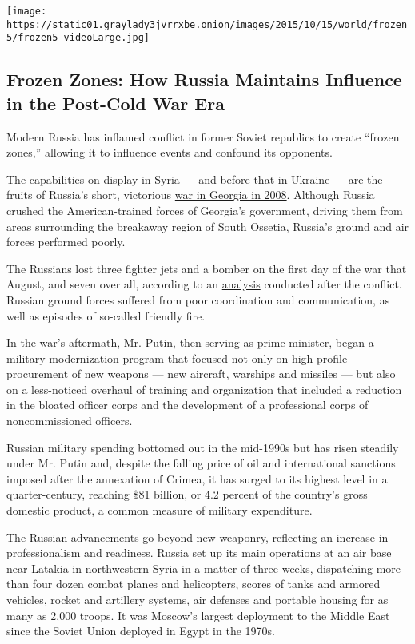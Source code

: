 \texttt{[image: https://static01.graylady3jvrrxbe.onion/images/2015/10/15/world/frozen5/frozen5-videoLarge.jpg]}

\hypertarget{frozen-zones-how-russia-maintains-influence-in-the-post-cold-war-era}{%
\subsection{Frozen Zones: How Russia Maintains Influence in the
Post-Cold War
Era}\label{frozen-zones-how-russia-maintains-influence-in-the-post-cold-war-era}}

Modern Russia has inflamed conflict in former Soviet republics to create
``frozen zones,'' allowing it to influence events and confound its
opponents.

The capabilities on display in Syria --- and before that in Ukraine ---
are the fruits of Russia's short, victorious
\href{http://www.nytimes3xbfgragh.onion/2008/08/09/world/europe/09georgia.html?pagewanted=all}{war
in Georgia in 2008}. Although Russia crushed the American-trained forces
of Georgia's government, driving them from areas surrounding the
breakaway region of South Ossetia, Russia's ground and air forces
performed poorly.

The Russians lost three fighter jets and a bomber on the first day of
the war that August, and seven over all, according to an
\href{http://www.cast.ru/eng/?id=328}{analysis} conducted after the
conflict. Russian ground forces suffered from poor coordination and
communication, as well as episodes of so-called friendly fire.

In the war's aftermath, Mr. Putin, then serving as prime minister, began
a military modernization program that focused not only on high-profile
procurement of new weapons --- new aircraft, warships and missiles ---
but also on a less-noticed overhaul of training and organization that
included a reduction in the bloated officer corps and the development of
a professional corps of noncommissioned officers.

Russian military spending bottomed out in the mid-1990s but has risen
steadily under Mr. Putin and, despite the falling price of oil and
international sanctions imposed after the annexation of Crimea, it has
surged to its highest level in a quarter-century, reaching \$81 billion,
or 4.2 percent of the country's gross domestic product, a common measure
of military expenditure.

The Russian advancements go beyond new weaponry, reflecting an increase
in professionalism and readiness. Russia set up its main operations at
an air base near Latakia in northwestern Syria in a matter of three
weeks, dispatching more than four dozen combat planes and helicopters,
scores of tanks and armored vehicles, rocket and artillery systems, air
defenses and portable housing for as many as 2,000 troops. It was
Moscow's largest deployment to the Middle East since the Soviet Union
deployed in Egypt in the 1970s.

